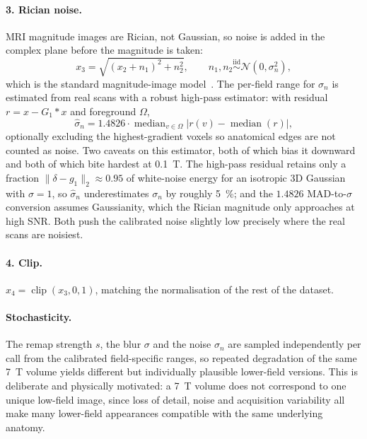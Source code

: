 \documentclass[11pt,a4paper]{article}
\begin{document}
\paragraph{3. Rician noise.} MRI magnitude images are Rician, not Gaussian, so noise is added in the
complex plane before the magnitude is taken:
\begin{equation}
  x_3 = \sqrt{(x_2 + n_1)^2 + n_2^2},
  \qquad n_1, n_2 \stackrel{\text{iid}}{\sim} \mathcal{N}(0, \sigma_n^2),
\end{equation}
which is the standard magnitude-image model~\cite{gudbjartsson1995rician}. The per-field range for
$\sigma_n$ is estimated from real scans with a robust high-pass estimator: with residual
$r = x - G_1 \ast x$ and foreground $\Omega$,
\begin{equation}
  \hat{\sigma}_n = 1.4826 \cdot \operatorname{median}_{v \in \Omega}
  \big| r(v) - \operatorname{median}(r) \big|,
\end{equation}
optionally excluding the highest-gradient voxels so anatomical edges are not counted as noise. Two
caveats on this estimator, both of which bias it downward and both of which bite hardest at
\SI{0.1}{\tesla}. The high-pass residual retains only a fraction
$\lVert \delta - g_1 \rVert_2 \approx 0.95$ of white-noise energy for an isotropic 3D Gaussian with
$\sigma = 1$, so $\hat{\sigma}_n$ underestimates $\sigma_n$ by roughly \SI{5}{\percent}; and the
$1.4826$ MAD-to-$\sigma$ conversion assumes Gaussianity, which the Rician magnitude only approaches at
high SNR. Both push the calibrated noise slightly low precisely where the real scans are noisiest.

\paragraph{4. Clip.} $x_4 = \operatorname{clip}(x_3, 0, 1)$, matching the normalisation of the rest of
the dataset.

\paragraph{Stochasticity.} The remap strength $s$, the blur $\sigma$ and the noise $\sigma_n$ are sampled
independently per call from the calibrated field-specific ranges, so repeated degradation of the same
\SI{7}{\tesla} volume yields different but individually plausible lower-field versions. This is
deliberate and physically motivated: a \SI{7}{\tesla} volume does not correspond to one unique low-field
image, since loss of detail, noise and acquisition variability all make many lower-field appearances
compatible with the same underlying anatomy.
\end{document}
